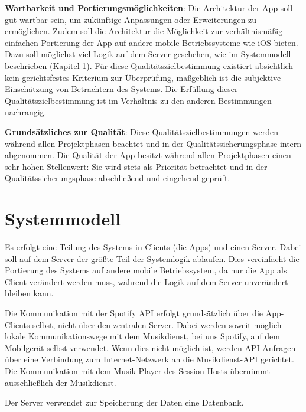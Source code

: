 \documentclass[oneside, ngerman]{sdqtechreport}
\begin{document}
\textbf{Wartbarkeit und Portierungsmöglichkeiten}: Die Architektur der App soll gut wartbar sein, um zukünftige Anpassungen oder Erweiterungen zu ermöglichen. Zudem soll die Architektur die Möglichkeit zur verhältnismäßig einfachen Portierung der App auf andere mobile Betriebssysteme wie iOS bieten. Dazu soll möglichst viel Logik auf dem Server geschehen, wie im Systemmodell beschrieben (Kapitel \ref{chap:Systemmodell}). Für diese Qualitätszielbestimmung existiert absichtlich kein gerichtsfestes Kriterium zur Überprüfung, maßgeblich ist die subjektive Einschätzung von Betrachtern des Systems. Die Erfüllung dieser Qualitätszielbestimmung ist im Verhältnis zu den anderen Bestimmungen nachrangig.

\vspace{1cm}

\textbf{Grundsätzliches zur Qualität}: Diese Qualitätszielbestimmungen werden während allen Projektphasen beachtet und in der Qualitätssicherungsphase intern abgenommen. Die Qualität der App besitzt während allen Projektphasen einen sehr hohen Stellenwert: Sie wird stets als Priorität betrachtet und in der Qualitätssicherungsphase abschließend und eingehend geprüft.


\chapter{Systemmodell}
\label{chap:Systemmodell}

Es erfolgt eine Teilung des Systems in Clients (die Apps) und einen Server. Dabei soll auf dem Server der größte Teil der Systemlogik ablaufen. Dies vereinfacht die Portierung des Systems auf andere mobile Betriebssystem, da nur die App als Client verändert werden muss, während die Logik auf dem Server unverändert bleiben kann.

Die Kommunikation mit der Spotify API erfolgt grundsätzlich über die App-Clients selbst, nicht über den zentralen Server. Dabei werden soweit möglich lokale Kommunikationswege mit dem Musikdienst, bei uns Spotify, auf dem Mobilgerät selbst verwendet. Wenn dies nicht möglich ist, werden API-Anfragen über eine Verbindung zum Internet-Netzwerk an die Musikdienst-API gerichtet. Die Kommunikation mit dem Musik-Player des Session-Hosts übernimmt ausschließlich der Musikdienst.

Der Server verwendet zur Speicherung der Daten eine Datenbank.

\vspace{1cm}
\end{document}
